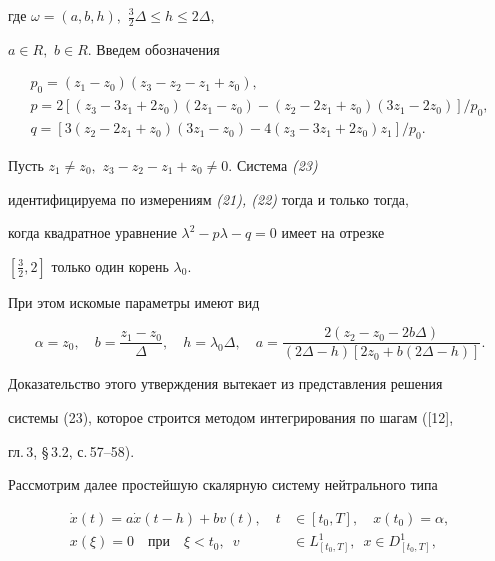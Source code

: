 где $\omega=(a, b, h),$ $\frac{3}{2}\Delta\le h\le 2\Delta,$


$a\in R,$ $b\in R.$ Введем обозначения


\begin{gather*}


p_0 = (z_1 - z_0)(z_3 - z_2 - z_1 + z_0),\\


p=2[(z_3 - 3 z_1 + 2z_0)(2z_1 - z_0)-(z_2 -2z_1 + z_0)(3z_1 - 2z_0)]/p_0,\\


q=[3(z_2 - 2z_1 + z_0)(3z_1 - z_0) -4(z_3 - 3z_1 + 2z_0) z_1]/p_0.


\end{gather*}





\begin{assrt}


Пусть $z_1\ne z_0,$ $z_3 - z_2 - z_1 + z_0\ne 0.$ Система {\em (23)}


идентифицируема по измерениям {\em (21), (22)} тогда и только тогда,


когда квадратное уравнение $\lambda^2-p\lambda-q=0$ имеет на отрезке


$[\frac{3}{2},2]$ только один корень $\lambda_0.$


При этом искомые параметры имеют вид


$$


\alpha=z_0,\quad b=\frac{z_1 - z_0}{\Delta},\quad h=\lambda_0\Delta,\quad


a=\frac{2(z_2-z_0 -2b\Delta)}{(2\Delta -h)[2z_0+b(2\Delta-h)]}.


$$


\end{assrt}





Доказательство этого утверждения вытекает из представления решения


системы (23), которое строится методом интегрирования по шагам ([12],


гл.\,3, \S\,3.2, с.\,57--58).





Рассмотрим далее простейшую скалярную систему нейтрального типа


\begin{equation}


\begin{split}


\Dot{x}(t) = a \Dot x(t-h) + b v(t),\quad t&\in[t_0,T],\quad x(t_0)=\alpha,\\


x(\xi)=0\quad \text{при}\quad \xi < t_0, \ \;


v&\in L^1_{[t_0,T]},\ \; x\in D^1_{[t_0,T]},


\end{split}


\end{equation}


